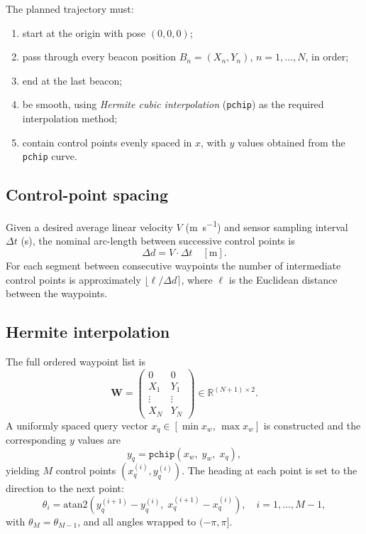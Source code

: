 \documentclass[a4paper,11pt]{report}
\begin{document}
The planned trajectory must:
\begin{enumerate}
  \item start at the origin with pose $(0, 0, 0)$;
  \item pass through every beacon position $B_n = (X_n, Y_n)$, $n = 1, \ldots, N$, in order;
  \item end at the last beacon;
  \item be smooth, using \emph{Hermite cubic interpolation} (\texttt{pchip}) as the required interpolation method;
  \item contain control points evenly spaced in $x$, with $y$ values obtained from the \texttt{pchip} curve.
\end{enumerate}

\subsection{Control-point spacing}

Given a desired average linear velocity $V$ (\si{\metre\per\second}) and sensor sampling interval $\Delta t$ (\si{\second}), the nominal arc-length between successive control points is
\begin{equation}
  \Delta d = V \cdot \Delta t \quad [\si{\metre}].
  \label{eq:delta_d}
\end{equation}
For each segment between consecutive waypoints the number of intermediate control points is approximately $\lfloor \ell / \Delta d \rceil$, where $\ell$ is the Euclidean distance between the waypoints.

\subsection{Hermite interpolation}

The full ordered waypoint list is
\begin{equation}
  \mathbf{W} =
  \begin{pmatrix} 0 & 0 \\ X_1 & Y_1 \\ \vdots & \vdots \\ X_N & Y_N \end{pmatrix} \in \mathbb{R}^{(N+1)\times 2}.
\end{equation}
A uniformly spaced query vector $x_q \in [\min x_w,\, \max x_w]$ is constructed and the corresponding $y$ values are
\begin{equation}
  y_q = \texttt{pchip}(x_w,\; y_w,\; x_q),
\end{equation}
yielding $M$ control points $(x_q^{(i)}, y_q^{(i)})$.  The heading at each point is set to the direction to the next point:
\begin{equation}
  \theta_i = \mathrm{atan2}\!\left(y_q^{(i+1)} - y_q^{(i)},\; x_q^{(i+1)} - x_q^{(i)}\right), \quad i = 1, \ldots, M-1,
\end{equation}
with $\theta_M = \theta_{M-1}$, and all angles wrapped to $(-\pi, \pi]$.
\end{document}
